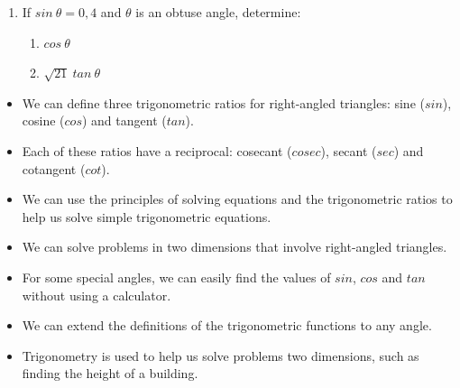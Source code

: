 \begin{exercises}{}
{\begin{enumerate}[itemsep=5pt, label=\textbf{\arabic*}. ]
\item If $sin~\theta= 0,4$ and $\theta$ is an obtuse angle, determine:
\begin{enumerate}[noitemsep, label=\textbf{(\alph*)} ]
 \item $cos~\theta$
\item $\sqrt{21}~tan~\theta$
\end{enumerate}
\end{enumerate}
}
\end{exercises}

\summary
\begin{itemize}[noitemsep]
\item We can define three trigonometric ratios for right-angled triangles: sine ($sin$), cosine ($cos$) and tangent ($tan$).
\item Each of these ratios have a reciprocal: cosecant ($cosec$), secant ($sec$) and cotangent ($cot$).
\item We can use the principles of solving equations and the trigonometric ratios to help us solve simple trigonometric equations.
\item We can solve problems in two dimensions that involve right-angled triangles.
\item For some special angles, we can easily find the values of $sin$, $cos$ and $tan$ without using a calculator.
\item We can extend the definitions of the trigonometric functions to any angle.
\item Trigonometry is used to help us solve problems two dimensions, such as finding the height of a building.
\end{itemize}


